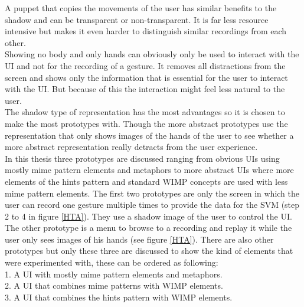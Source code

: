 A puppet that copies the movements of the user has similar benefits to the shadow and can be transparent or non-transparent. It is far less resource intensive but makes it even harder to distinguish similar recordings from each other.\\
 
Showing no body and only hands can obviously only be used to interact with the UI and not for the recording of a gesture. It removes all distractions from the screen and shows only the information that is essential for the user to interact with the UI. But because of this the interaction might feel less natural to the user.\\
 
The shadow type of representation has the most advantages so it is chosen to make the most prototypes with. Though the more abstract prototypes use the representation that only shows images of the hands of the user to see whether a more abstract representation really detracts from the user experience. \\
 
In this thesis three prototypes are discussed ranging from obvious UIs using mostly mime pattern elements and metaphors to more abstract UIs where more elements of the hints pattern and standard WIMP concepts are used with less mime pattern elements. The first two prototypes are only the screen in which the user can record one gesture multiple times to provide the data for the SVM (step 2 to 4 in figure \ref{HTA}). They use a shadow image of the user to control the UI. The other prototype is a menu to browse to a recording and replay it while the user only sees images of his hands (see figure \ref{HTA}). There are also other prototypes but only these three are discussed to show the kind of elements that were experimented with, these can be ordered as following:\\

1. A UI with mostly mime pattern elements and metaphors.\\
2. A UI that combines mime patterns with WIMP elements.\\
3. A UI that combines the hints pattern with WIMP elements.\\

